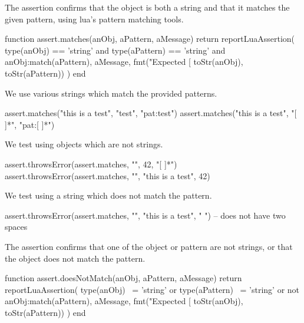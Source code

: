 \stopTestSuite


The  assertion confirms that the object is both a 
string and that it matches the given pattern, using lua's pattern matching 
tools. 

\startLuaCode
function assert.matches(anObj, aPattern, aMessage)
  return reportLuaAssertion(
    type(anObj) == 'string' and type(aPattern) == 'string' 
    and anObj:match(aPattern),
    aMessage,
    fmt("Expected [%
      toStr(anObj), toStr(aPattern))
  )
end
\stopLuaCode


We use various strings which match the provided patterns. 

\startLuaTest
  assert.matches("this is a test", "test", "pat:test")
  assert.matches("this is a test", "[ ]*", "pat:[ ]*")
\stopLuaTest
\stopTestCase


We test using objects which are not strings.

\startLuaTest
  assert.throwsError(assert.matches, "", 42, "[ ]*")
  assert.throwsError(assert.matches, "",
    "this is a test", 42)
\stopLuaTest
\stopTestCase


We test using a string which does not match the pattern.

\startLuaTest
  assert.throwsError(assert.matches, "", 
    "this is a test", "  ") -- does not have two spaces
\stopLuaTest
\stopTestCase

\stopTestSuite


The  assertion confirms that one of the object 
or pattern are not strings, or that the object does not match the pattern. 

\startLuaCode
function assert.doesNotMatch(anObj, aPattern, aMessage)
  return reportLuaAssertion(
    type(anObj) ~= 'string' or type(aPattern) ~= 'string' 
    or not anObj:match(aPattern),
    aMessage,
    fmt("Expected [%
      toStr(anObj), toStr(aPattern))
  )
end
\stopLuaCode


